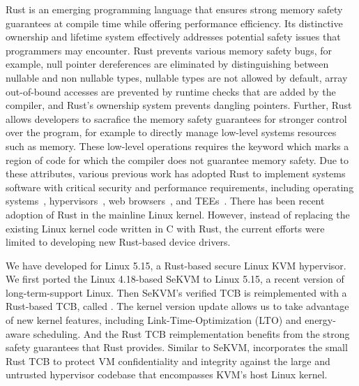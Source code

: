 Rust is an emerging programming language that ensures strong memory safety
guarantees at compile time while offering performance efficiency.
Its distinctive ownership and lifetime system
effectively addresses potential safety issues that programmers may encounter.
Rust prevents various memory safety bugs, for example, null pointer
dereferences are eliminated by distinguishing between nullable and non
nullable types, nullable types are not allowed by default, array out-of-bound
accesses are prevented by runtime checks that are added by the compiler, and
Rust's ownership system prevents dangling pointers.
Further, Rust allows developers to
sacrafice the memory safety guarantees for stronger control over the program,
for example to directly manage low-level systems resources such as memory.
These low-level operations requires the  keyword which marks a
region of code for which the compiler does not guarantee memory safety.
Due to these
attributes, various previous work has adopted Rust to implement systems
software with critical security and performance requirements, including
operating systems~\cite{NrOS, Redleaf, TockOS, theseus},
hypervisors~\cite{DuVisor, RustyHermit}, web browsers~\cite{servo},
and TEEs~\cite{rustsgx,rustee}.
There has been recent adoption of Rust in the mainline Linux kernel. However,
instead of replacing the existing Linux kernel code written in C with Rust,
the current efforts were limited to developing new Rust-based device drivers.

We have developed \rustsec{} for Linux 5.15, a Rust-based secure Linux KVM hypervisor.
We first ported the Linux 4.18-based SeKVM to Linux 5.15, a recent version of long-term-support Linux.
Then SeKVM's verified TCB is reimplemented with a Rust-based TCB, called \rustcore{}.
The kernel version update allows us to take advantage of new kernel features, including Link-Time-Optimization (LTO) and energy-aware scheduling.
And the Rust TCB reimplementation benefits from the strong safety guarantees that Rust provides.
Similar to SeKVM, \rustsec{} incorporates the small Rust TCB \rustcore{} to
protect VM confidentiality and integrity against the large and untrusted
hypervisor codebase that encompasses KVM’s host Linux kernel.

